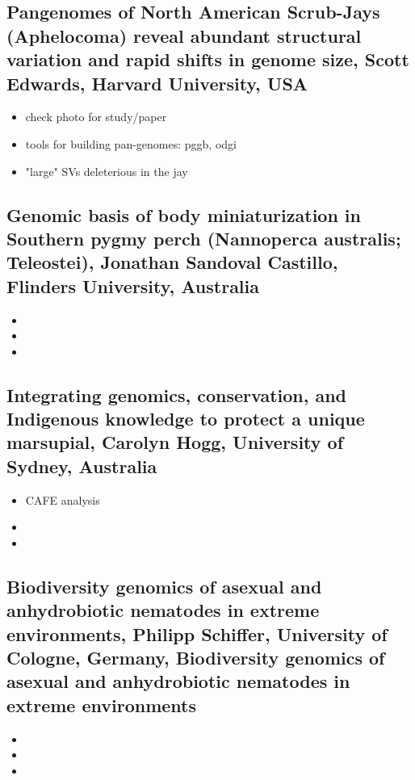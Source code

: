 \documentclass[document.tex]{subfiles}
\begin{document}
        \subsection{Pangenomes of North American Scrub-Jays (Aphelocoma) reveal abundant structural variation and rapid shifts in genome size, Scott Edwards, Harvard University, USA}
        \begin{itemize}
        \item check photo for study/paper
        \item tools for building pan-genomes: pggb, odgi 
        \item "large" SVs deleterious in the jay 
        \end{itemize}

        \subsection{Genomic basis of body miniaturization in Southern pygmy perch (Nannoperca australis; Teleostei), Jonathan Sandoval Castillo, Flinders University, Australia}
        \begin{itemize}
        \item 
        \item 
        \item 
        \end{itemize}


        \subsection{Integrating genomics, conservation, and Indigenous knowledge to protect a unique marsupial, Carolyn Hogg, University of Sydney, Australia}
        \begin{itemize}
        \item CAFE analysis 
        \item 
        \item 
        \end{itemize}

        \subsection{Biodiversity genomics of asexual and anhydrobiotic nematodes in extreme environments, Philipp Schiffer, University of Cologne, Germany, Biodiversity genomics of asexual and anhydrobiotic nematodes in extreme environments}
        \begin{itemize}
            \item 
            \item 
            \item 
            \end{itemize} 
\end{document}
